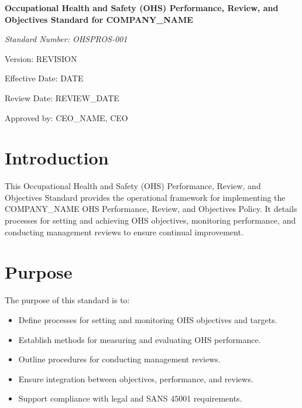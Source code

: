 \documentclass[12pt]{article}
\begin{document}
\begin{titlepage}
    \centering
    \vspace*{2cm}
    {\LARGE\bfseries Occupational Health and Safety (OHS) Performance, Review, and Objectives Standard for {{COMPANY_NAME}}\par}
    \vspace{1cm}
    {\large\itshape Standard Number: OHSPROS-001\par}
    \vspace{0.5cm}
    {\normalsize Version: {{REVISION}}\par}
    \vspace{0.5cm}
    {\normalsize Effective Date: {{DATE}}\par}
    \vspace{0.5cm}
    {\normalsize Review Date: {{REVIEW_DATE}}\par}
    \vspace{2cm}
    {\normalsize Approved by: {{CEO_NAME}}, CEO\par}
\end{titlepage}

\section{Introduction}
This Occupational Health and Safety (OHS) Performance, Review, and Objectives Standard provides the operational framework for implementing the {{COMPANY_NAME}} OHS Performance, Review, and Objectives Policy. It details processes for setting and achieving OHS objectives, monitoring performance, and conducting management reviews to ensure continual improvement.

\section{Purpose}
The purpose of this standard is to:
\begin{itemize}
    \item Define processes for setting and monitoring OHS objectives and targets.
    \item Establish methods for measuring and evaluating OHS performance.
    \item Outline procedures for conducting management reviews.
    \item Ensure integration between objectives, performance, and reviews.
    \item Support compliance with legal and SANS 45001 requirements.
\end{itemize}
\end{document}
